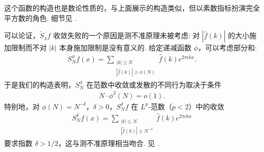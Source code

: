 这个函数的构造也是数论性质的，与上面展示的构造类似，但以素数指标扮演完全平方数的角色. 细节见 \cite{b182}.

可以论证，$\tilde{S}_{\lambda}f$ 收敛失败的一个原因是测不准原理未被考虑: 对 $|\widehat{f}(k)|$ 的大小施加限制而不对 $|k|$ 本身施加限制是没有意义的. 给定递减函数 $\phi$，可以考虑部分和:
\begin{align*}
  S_{N}^{\phi}f(x)=\sum_{\substack{|k|\leq N\\ |\widehat{f}(k)|\geq\phi(N)}}\widehat{f}(k)e^{2\pi i k x}.
\end{align*}
于是我们的构造表明，$S_{N}^{\phi}$ 在范数中收敛或发散的不同行为取决于条件
\begin{align*}
  N\cdot\phi^{2}(N)=o(1).
\end{align*}
特别地，对 $\phi(N) = N^{-\delta}$，$\delta > 0$，$S_{N}^{\delta}f$ 在 $L^{p}$-范数（$p < 2$）中的收敛
\begin{align*}
  S_{N}^{\delta}f(x)=\sum_{\substack{|k|\leq N\\ |\widehat{f}(k)|\geq N^{-\delta}}}\widehat{f}(k)e^{2\pi i k x}
\end{align*}
要求指数 $\delta > 1/2$，这与测不准原理相当吻合. 见 \cite{b182}.

